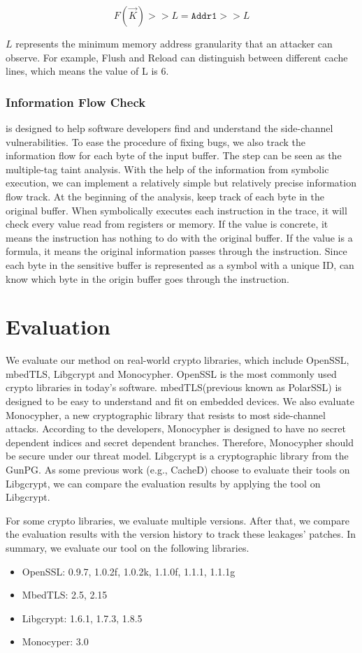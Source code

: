 $$F(\vec{K}) >> L = \mathtt{Addr1} >> L$$

$L$ represents the minimum memory address granularity that an attacker can observe. For example, Flush and Reload can distinguish between different cache lines, which means the value of L is 6.

\subsubsection{Information Flow Check}
\detect{} is designed to help software developers find and understand the side-channel vulnerabilities. To ease the procedure of fixing bugs, we also track the information flow for each byte of the input
buffer.
The step can be seen as the multiple-tag taint analysis. With the help of the information from symbolic execution, we can implement a relatively simple but relatively precise information flow track.
At the beginning of the analysis, \detect{} keep track of each byte in
the original buffer. When \detect{} symbolically executes each instruction in the trace, it will check every value read from registers or memory. If the value is concrete, it means the instruction has nothing to do with the original buffer.
If the value is a formula, it means the original information passes through the instruction. Since each byte in the sensitive buffer is represented as a symbol with a unique ID, \detect{} can know which byte in the origin buffer goes through the instruction.

\section{Evaluation}
We evaluate our method on real-world crypto libraries, which include  OpenSSL, mbedTLS, Libgcrypt and Monocypher\@. OpenSSL is the most commonly used crypto libraries in today's software. mbedTLS\@ (previous known as PolarSSL) is designed to be easy to understand and fit on embedded devices. We also evaluate Monocypher, a new cryptographic library that resists to most side-channel attacks.
According to the developers, Monocypher is designed to have no secret dependent indices and secret dependent branches. Therefore, Monocypher should be secure under our threat model. Libgcrypt is a cryptographic library from the GunPG. As some previous work (e.g., CacheD) choose to evaluate their tools on Libgcrypt, we can compare the evaluation results by applying the tool on Libgcrypt.

For some crypto libraries, we evaluate multiple versions. After that, we compare the evaluation results with the version history to track these leakages' patches. In summary, we evaluate our tool on the following libraries.
\begin{itemize}
  \item OpenSSL: 0.9.7, 1.0.2f, 1.0.2k, 1.1.0f, 1.1.1, 1.1.1g
  \item MbedTLS: 2.5, 2.15
  \item Libgcrypt: 1.6.1, 1.7.3, 1.8.5
  \item Monocyper: 3.0
\end{itemize}


